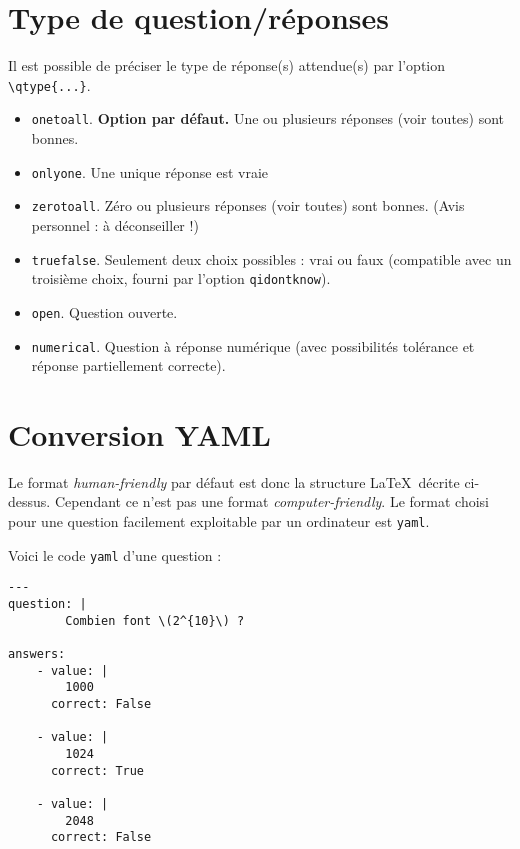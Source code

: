 \documentclass[12pt,a4paper]{article}
\begin{document}
\section{Type de question/réponses}

Il est possible de préciser le type de réponse(s) attendue(s) par l'option \verb|\qtype{...}|.

\begin{itemize}
  \item  \verb|onetoall|. \textbf{Option par défaut.} Une ou plusieurs réponses (voir toutes) sont bonnes.
  \item \verb|onlyone|. Une unique réponse est vraie
  \item \verb|zerotoall|. Zéro ou plusieurs réponses (voir toutes) sont bonnes. (Avis personnel : à déconseiller !)
  \item \verb|truefalse|. Seulement deux choix possibles : vrai ou faux (compatible avec un troisième choix, fourni par l'option \verb|qidontknow|).
  \item \verb|open|. Question ouverte.
  \item \verb|numerical|. Question à réponse numérique (avec possibilités tolérance et réponse partiellement correcte).
\end{itemize}  
  







\section{Conversion YAML}


Le format \emph{human-friendly} par défaut est donc la structure \LaTeX\ décrite ci-dessus. Cependant ce n'est pas une format \emph{computer-friendly}. Le format choisi pour une question facilement exploitable par un ordinateur est \texttt{yaml}.

Voici le code \texttt{yaml} d'une question :
\begin{center}
\begin{minipage}{0.8\textwidth}
\begin{verbatim}
---
question: |
        Combien font \(2^{10}\) ?

answers: 
    - value: |
        1000
      correct: False

    - value: |
        1024
      correct: True

    - value: |
        2048
      correct: False
\end{verbatim}
\end{minipage}
\end{center}
\end{document}
